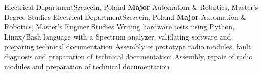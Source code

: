 \documentclass[
    10pt,
    A4,
    english,
    draft = false,
    twoside = false,
]{article}
\begin{document}
	{Electrical Department}{Szczecin, Poland}
	{\textbf{Major} Automation \& Robotics, Master's Degree Studies}
	{Electrical Department}{Szczecin, Poland}
	{\textbf{Major} Automation \& Robotics, Master's Enginer Studies}
	{Writing hardware tests using Python, Linux/Bash language with a Spectrum analyzer, validating software and preparing technical documentation}	
	{Assembly of prototype radio modules, fault diagnosis and preparation of technical documentation} 
	{Assembly, repair of radio modules and preparation of technical documentation}
\end{document}
